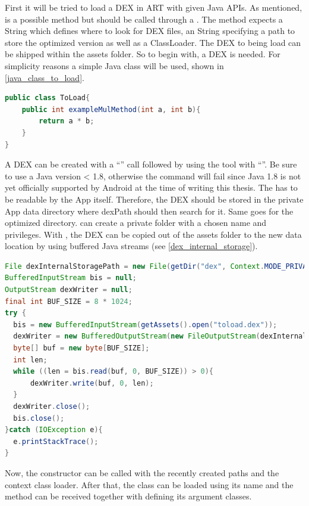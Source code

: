 First it will be tried to load a DEX in ART with given Java APIs.
As mentioned,  is a possible method but should be called
through a . The method expects a  String which defines where to look for DEX files, an  String specifying a path to store the optimized version as well as a  ClassLoader.
The DEX to being load can be shipped within the assets folder.
So to begin with, a DEX is needed. For simplicity reasons a simple Java class will be used, shown in \autoref{java_class_to_load}.
\begin{lstlisting}[language=Java, caption=Java Class to load, label=java_class_to_load]
public class ToLoad{
    public int exampleMulMethod(int a, int b){
        return a * b;
    }
}
\end{lstlisting}
A DEX can be created with a ``'' call followed by
using the  tool with ``''. Be sure to use a Java version < 1.8, otherwise the 
command will fail since Java 1.8 is not yet officially supported by Android at the time of writing this thesis.
The  has to be readable by the App itself. Therefore,
the DEX should be stored in the private App data directory where dexPath should then
search for it. Same goes for the optimized directory.
 can create a private folder with a chosen name
and privileges. With , the DEX can be
copied out of the assets folder to the new data location by using buffered Java streams (see \autoref{dex_internal_storage}).
\begin{lstlisting}[language=Java, caption=Dex Internal Storage, label=dex_internal_storage]
File dexInternalStoragePath = new File(getDir("dex", Context.MODE_PRIVATE), "toload.dex");
BufferedInputStream bis = null;
OutputStream dexWriter = null;
final int BUF_SIZE = 8 * 1024;
try {
  bis = new BufferedInputStream(getAssets().open("toload.dex"));
  dexWriter = new BufferedOutputStream(new FileOutputStream(dexInternalStoragePath));
  byte[] buf = new byte[BUF_SIZE];
  int len;
  while ((len = bis.read(buf, 0, BUF_SIZE)) > 0){
      dexWriter.write(buf, 0, len);
  }
  dexWriter.close();
  bis.close();
}catch (IOException e){
  e.printStackTrace();
}
\end{lstlisting}
Now, the  constructor can be called with the recently
created paths and the context class loader. After that, the class can be loaded
using its name and the method can be received together with defining its argument classes.
